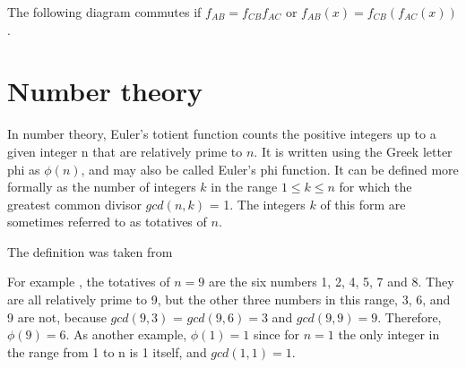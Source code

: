 \begin{appendices}
\begin{definition}
  The following diagram commutes if $f_{AB} = f_{CB} f_{AC}$ or
  $f_{AB}\left(x\right) = f_{CB} \left(f_{AC}\left(x\right)\right)$.

\end{definition}

\section{Number theory}

\begin{definition}
  In number theory, Euler's totient function counts the positive
  integers up to a given integer n that are relatively prime to $n$. It
  is written using the Greek letter phi as $\phi\left(n\right)$, and
  may also be called Euler's phi function. It can be defined more formally as
  the number of integers $k$ in the range $1 \le k \le n$ for which the
  greatest common divisor $gcd\left(n, k\right)$ = 1. The integers $k$ of this
  form are sometimes referred to as totatives of $n$.

  The definition was taken from \cite{wiki:eulerfunction}
  \label{def:eulerfuction}
\end{definition}

\begin{example}
  For example \cite{wiki:eulerfunction}, the totatives of $n = 9$ are
  the six numbers 1, 2, 4, 5, 
  7 and 8. They are all relatively prime to 9, but the other three
  numbers in this range, 3, 6, and 9 are not, because
  $gcd\left(9, 3\right)$ =
  $gcd\left(9, 6\right) = 3$ and $gcd\left(9, 9\right) = 9$.
  Therefore, $\phi\left(9\right) = 6$. As another
  example, $\phi\left(1\right) = 1$ since for $n = 1$ the only integer in the range from
  1 to n is 1 itself, and $gcd\left(1, 1\right) = 1$. 
\end{example}

\end{appendices}
